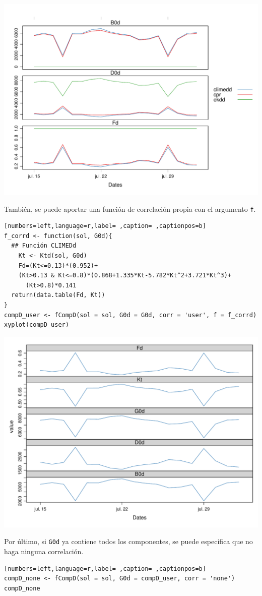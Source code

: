 \begin{itemize}
\begin{itemize}
\begin{center}
\includegraphics[width=\textwidth]{figuras/codigo-fcompddia.pdf}
\end{center}
También, se puede aportar una función de correlación propia con el argumento \texttt{f}.
\begin{lstlisting}[numbers=left,language=r,label= ,caption= ,captionpos=b]
f_corrd <- function(sol, G0d){
  ## Función CLIMEDd
    Kt <- Ktd(sol, G0d)
    Fd=(Kt<=0.13)*(0.952)+
    (Kt>0.13 & Kt<=0.8)*(0.868+1.335*Kt-5.782*Kt^2+3.721*Kt^3)+
      (Kt>0.8)*0.141
  return(data.table(Fd, Kt))
}
compD_user <- fCompD(sol = sol, G0d = G0d, corr = 'user', f = f_corrd)
xyplot(compD_user)
\end{lstlisting}

\begin{center}
\includegraphics[width=\textwidth]{figuras/codigo-fcompduser.pdf}
\end{center}
Por último, si \texttt{G0d} ya contiene todos los componentes, se puede especifica que no haga ninguna correlación.
\begin{lstlisting}[numbers=left,language=r,label= ,caption= ,captionpos=b]
compD_none <- fCompD(sol = sol, G0d = compD_user, corr = 'none')
compD_none
\end{lstlisting}


\end{itemize}
\end{itemize}
